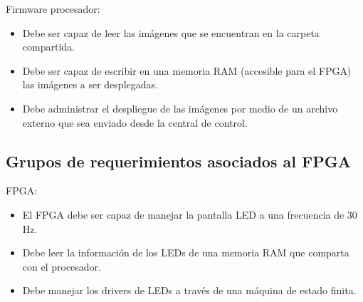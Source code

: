 Firmware procesador:
\begin{itemize}
\item Debe ser capaz de leer las imágenes que se encuentran en la carpeta compartida.
\item Debe ser capaz de escribir en una memoria RAM (accesible para el FPGA) las imágenes a ser desplegadas.
\item Debe administrar el despliegue de las imágenes por medio de un archivo externo que sea enviado desde la central de control.
\end{itemize}
\subsection{Grupos de requerimientos asociados al FPGA}
FPGA:
\begin{itemize}
\item El FPGA debe ser capaz de manejar la pantalla LED a una frecuencia de  30 Hz.
\item Debe leer la información de los LEDs de una memoria RAM que comparta con el procesador.
\item Debe manejar los drivers de LEDs a través de una máquina de estado finita.   
\end{itemize}